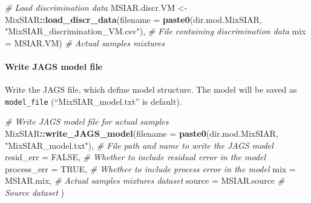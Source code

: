 \documentclass[
]{article}
\newenvironment{Shaded}{\begin{snugshade}}{\end{snugshade}}
\newcommand{\AttributeTok}[1]{\textcolor[rgb]{0.13,0.29,0.53}{#1}}
\newcommand{\CommentTok}[1]{\textcolor[rgb]{0.56,0.35,0.01}{\textit{#1}}}
\newcommand{\ConstantTok}[1]{\textcolor[rgb]{0.56,0.35,0.01}{#1}}
\newcommand{\FunctionTok}[1]{\textcolor[rgb]{0.13,0.29,0.53}{\textbf{#1}}}
\newcommand{\NormalTok}[1]{#1}
\newcommand{\OtherTok}[1]{\textcolor[rgb]{0.56,0.35,0.01}{#1}}
\newcommand{\SpecialCharTok}[1]{\textcolor[rgb]{0.81,0.36,0.00}{\textbf{#1}}}
\newcommand{\StringTok}[1]{\textcolor[rgb]{0.31,0.60,0.02}{#1}}
\begin{document}
\begin{Shaded}
\begin{Highlighting}[]
\CommentTok{\# Load discrimination data}
\NormalTok{MSIAR.discr.VM }\OtherTok{\textless{}{-}}\NormalTok{ MixSIAR}\SpecialCharTok{::}\FunctionTok{load\_discr\_data}\NormalTok{(}\AttributeTok{filename =} \FunctionTok{paste0}\NormalTok{(dir.mod.MixSIAR, }\StringTok{"MixSIAR\_discrimination\_VM.csv"}\NormalTok{), }\CommentTok{\# File containing discrimination data}
                                        \AttributeTok{mix =}\NormalTok{ MSIAR.VM)                                                         }\CommentTok{\# Actual samples mixtures}
\end{Highlighting}
\end{Shaded}

\hypertarget{write-jags-model-file}{%
\paragraph{Write JAGS model file}\label{write-jags-model-file}}

Write the JAGS file, which define model structure. The model will be
saved as \texttt{model\_file} (``MixSIAR\_model.txt'' is default).

\begin{Shaded}
\begin{Highlighting}[]
\CommentTok{\# Write JAGS model file for actual samples}
\NormalTok{MixSIAR}\SpecialCharTok{::}\FunctionTok{write\_JAGS\_model}\NormalTok{(}\AttributeTok{filename =} \FunctionTok{paste0}\NormalTok{(dir.mod.MixSIAR, }\StringTok{"MixSIAR\_model.txt"}\NormalTok{),    }\CommentTok{\# File path and name to write the JAGS model}
                          \AttributeTok{resid\_err =} \ConstantTok{FALSE}\NormalTok{,                                          }\CommentTok{\# Whether to include residual error in the model}
                          \AttributeTok{process\_err =} \ConstantTok{TRUE}\NormalTok{,                                         }\CommentTok{\# Whether to include process error in the model}
                          \AttributeTok{mix =}\NormalTok{ MSIAR.mix,                                            }\CommentTok{\# Actual samples mixtures dataset}
                          \AttributeTok{source =}\NormalTok{ MSIAR.source                                       }\CommentTok{\# Source dataset}
\NormalTok{                          )}
\end{Highlighting}
\end{Shaded}
\end{document}
